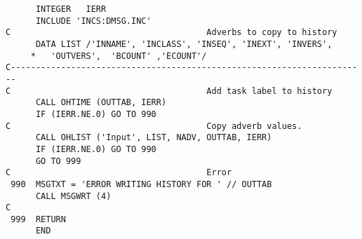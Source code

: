 {\begin{verbatim}
      INTEGER   IERR
      INCLUDE 'INCS:DMSG.INC'
C                                       Adverbs to copy to history
      DATA LIST /'INNAME', 'INCLASS', 'INSEQ', 'INEXT', 'INVERS',
     *   'OUTVERS',  'BCOUNT' ,'ECOUNT'/
C-----------------------------------------------------------------------
C                                       Add task label to history
      CALL OHTIME (OUTTAB, IERR)
      IF (IERR.NE.0) GO TO 990
C                                       Copy adverb values.
      CALL OHLIST ('Input', LIST, NADV, OUTTAB, IERR)
      IF (IERR.NE.0) GO TO 990
      GO TO 999
C                                       Error
 990  MSGTXT = 'ERROR WRITING HISTORY FOR ' // OUTTAB
      CALL MSGWRT (4)
C
 999  RETURN
      END
\end{verbatim}}


